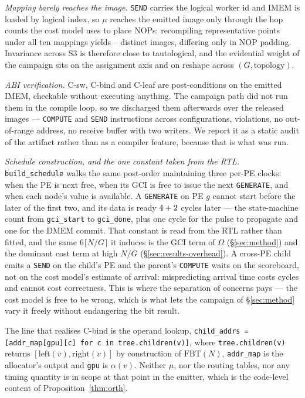 \documentclass[journal,10pt]{IEEEtran}
\theoremstyle{plain}
\theoremstyle{definition}
\theoremstyle{remark}
\newcommand{\FBT}{\ensuremath{\mathrm{FBT}}}
\newcommand{\sv}[1]{\texttt{#1}}
\newcommand{\asgn}{\ensuremath{\alpha}}
\newcommand{\map}{\ensuremath{\mu}}
\begin{document}
\emph{Mapping barely reaches the image.} \texttt{SEND} carries the logical
worker id and IMEM is loaded by logical index, so $\map$ reaches the emitted
image only through the hop counts the cost model uses to place NOPs:
recompiling \MapPoints{} representative points under all ten mappings yields
\MapImagesLo{}--\MapImagesHi{} distinct images, differing only in NOP padding.
Invariance across S3 is therefore close to tautological, and the evidential
weight of the campaign sits on the assignment axis and on reshape across
$(G,\text{topology})$.

\emph{ABI verification.} \textsf{C-sw}, \textsf{C-bind} and \textsf{C-leaf}
are post-conditions on the emitted IMEM, checkable without executing anything.
The campaign path did not run them in the compile loop, so we discharged them
afterwards over the released images --- \BindComputes{} \texttt{COMPUTE} and
\BindSends{} \texttt{SEND} instructions across \BindConfigs{} configurations,
\BindViolations{} violations, no out-of-range address, no receive buffer with
two writers. We report it as a static audit of the artifact rather than as a
compiler feature, because that is what was run.

\emph{Schedule construction, and the one constant taken from the RTL.}
\sv{build\_schedule} walks the same post-order maintaining three per-PE
clocks: when the PE is next free, when its GCI is free to issue the next
\texttt{GENERATE}, and when each node's value is available. A
\texttt{GENERATE} on PE $g$ cannot start before the later of the first two,
and its data is ready $4 + 2$ cycles later --- the state-machine
count from \sv{gci\_start} to \sv{gci\_done}, plus one cycle for the pulse to
propagate and one for the DMEM commit. That constant is read from the RTL
rather than fitted, and the same $6\lceil N/G\rceil$ it induces is the GCI
term of $\Omega$ (\S\ref{sec:method}) and the dominant cost term at high
$N/G$ (\S\ref{sec:results-overhead}). A cross-PE child emits a
\texttt{SEND} on the child's PE and the parent's \texttt{COMPUTE} waits on
the scoreboard, not on the cost model's estimate of arrival: mispredicting
arrival time costs cycles and cannot cost correctness. This is where the
separation of concerns pays --- the cost model is free to be wrong, which is
what lets the campaign of \S\ref{sec:method} vary it freely without
endangering the bit result.

The line that realises \textsf{C-bind} is the operand lookup,
\texttt{child\_addrs = [addr\_map[gpu][c] for c in tree.children(v)]},
where \texttt{tree.children(v)} returns $[\mathrm{left}(v),\mathrm{right}(v)]$
by construction of $\FBT(N)$, \texttt{addr\_map} is the allocator's output
and \texttt{gpu} is $\asgn(v)$. Neither $\map$, nor the routing tables, nor
any timing quantity is in scope at that point in the emitter, which is the
code-level content of Proposition~\ref{thm:orth}.
\end{document}
